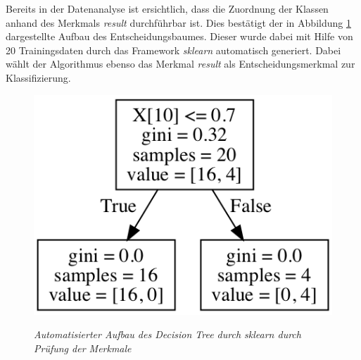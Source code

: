 \documentclass[conference]{IEEEtran}
\begin{document}
Bereits in der Datenanalyse ist ersichtlich, dass die Zuordnung der Klassen anhand des Merkmals \textit{result} durchführbar ist. Dies bestätigt der in Abbildung \ref{fig:tree_graph} dargestellte Aufbau des Entscheidungsbaumes. Dieser wurde dabei mit Hilfe von 20 Trainingsdaten durch das Framework \textit{sklearn} automatisch generiert. Dabei wählt der Algorithmus ebenso das Merkmal \textit{result} als Entscheidungsmerkmal zur Klassifizierung.

\begin{figure}[h!]
\centering
\includegraphics[scale=0.7]{graphs/tree_graph.png}
\label{fig:tree_graph}
\caption{\em Automatisierter Aufbau des Decision Tree durch \textit{sklearn} durch Prüfung der Merkmale}
\end{figure}


\end{document}
